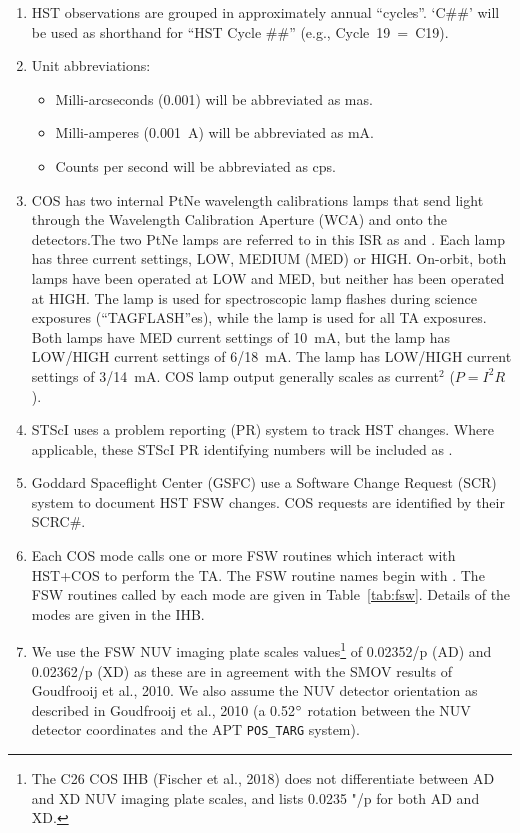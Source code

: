 \begin{enumerate}
{	%
	}
	\item{HST observations are grouped in approximately annual ``cycles''. `C\#\#' will be used as shorthand for ``HST Cycle \#\#'' (e.g., Cycle~19~=~C19).}
	\item{Unit abbreviations:
		\begin{itemize}
		\item{Milli-arcseconds (0.001\arcsec) will be abbreviated as mas.}
		\item{Milli-amperes (0.001~A) will be abbreviated as mA.}
		\item{Counts per second will be abbreviated as cps.}
		\end{itemize}
	}
	\item{COS has two internal PtNe wavelength calibrations lamps that send light through the Wavelength Calibration Aperture (WCA) and onto the detectors.The two PtNe lamps are referred to in this ISR
	as \plampone{} and \plamptwo{}. Each lamp has three current settings, LOW, MEDIUM (MED) or HIGH. On-orbit, both lamps have been operated at LOW and MED, but neither has been operated at HIGH.
	The \plampone{} lamp is used for spectroscopic lamp flashes during science exposures (``TAGFLASH''es), while the \plamptwo{} lamp is used for all TA exposures.
	Both lamps have MED current settings of 10~mA, but the \plampone{} lamp has LOW/HIGH current settings of 6/18~mA. The \plamptwo{} lamp
	has LOW/HIGH current settings of 3/14~mA. COS lamp output generally scales as current$^{2}$ ($P=I^2 R$).}
	\item{STScI uses a problem reporting (PR) system to track HST changes.
		Where applicable, these STScI PR identifying numbers will be included as \pr{}.}
	\item{Goddard Spaceflight Center (GSFC) use a Software Change Request (SCR) system to document HST FSW changes.
	COS requests are identified by their SCRC\#. }
	\item{Each COS \tacq{} mode calls one or more FSW routines which interact with HST+COS to perform the TA.
		The FSW routine names begin with \fsw{}.
		The FSW routines called by each \tacq{} mode are given in Table~\ref{tab:fsw}.
		Details of the \tacq{} modes are given in the IHB.
		}
	\item{We use the FSW NUV imaging plate scales values\footnote{The C26 COS IHB (Fischer et al., 2018) does not differentiate between AD and XD NUV imaging plate scales, and lists 0.0235 "/p for both AD and XD.} of 0.02352\arcsec/p (AD) and 0.02362\arcsec/p (XD) as these
	are in agreement with the SMOV results of Goudfrooij et al., 2010. We also assume
	the NUV detector orientation as described in Goudfrooij et al., 2010 (a 0.52$\hbox{$^{\circ}$}$ rotation between the
	NUV detector coordinates and the APT \texttt{POS\_TARG} system). }
\end{enumerate}

